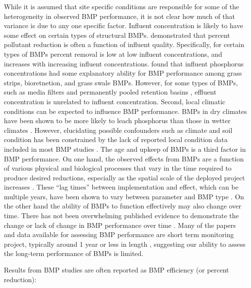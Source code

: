 \documentclass[utf8]{FrontiersinHarvard}
\begin{document}
While it is assumed that site specific conditions are responsible for some of the heterogeneity in observed BMP performance, it is not clear how much of that variance is due to any one specific factor.
Influent concentration is likely to have some effect on certain types of structural BMPs.
\citet{barrettPerformanceComparisonStructural2005} demonstrated that percent pollutant reduction is often a function of influent quality.
Specifically, for certain types of BMPs percent removal is low at low influent concentrations, and increases with increasing influent concentrations.
\citet{horvathEffectsRegionalClimate2023} found that influent phosphorus concentrations had some explanatory ability for BMP performance among grass strips, bioretnetion, and grass swale BMPs.
However, for some types of BMPs, such as media filters and permanently pooled retention basins \citep{barrettPerformanceComparisonStructural2005}, effluent concentration is unrelated to influent concentration.
Second, local climatic conditions can be expected to influence BMP performance.
BMPs in dry climates have been shown to be more likely to leach phosphorus than those in wetter climates \citep{horvathEffectsRegionalClimate2023}.
However, elucidating possible confounders such as climate and soil condition has been constrained by the lack of reported local condition data included in most BMP studies \citep{horvathEffectsRegionalClimate2023, kochNitrogenRemovalStormwater2014, eagleMetaAnalysisConstrained2017}.
The age and upkeep of BMPs is a third factor in BMP performance.
On one hand, the observed effects from BMPs are a function of various physical and biological processes that vary in the time required to produce desired reductions, especially as the spatial scale of the deployed project increases \citep{mealsLagTimeWater2010}.
These ``lag times'' between implementation and effect, which can be multiple years, have been shown to vary between parameter and BMP type \citep{mealsLagTimeWater2010}.
On the other hand the ability of BMPs to function effectively may also change over time.
There has not been overwhelming published evidence to demonstrate the change or lack of change in BMP performance over time \citep{liuReviewEffectivenessBest2017}.
Many of the papers and data available for assessing BMP performance are short term monitoring project, typically around 1 year or less in length \citep{liuReviewEffectivenessBest2017, kochNitrogenRemovalStormwater2014}, suggesting our ability to assess the long-term performance of BMPs is limited.

Results from BMP studies are often reported as BMP efficiency (or percent reduction):
\end{document}
